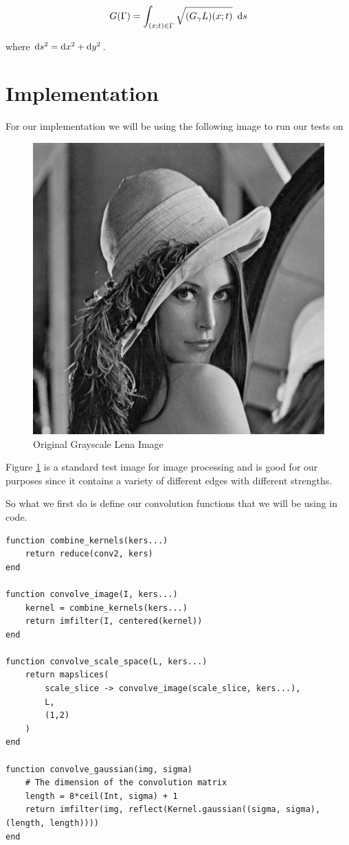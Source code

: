 \documentclass{article}
\begin{document}
\begin{equation}
  G(\Gamma) = \int_{(x;t) \in \Gamma} \sqrt{(G_{\gamma}L)(x;t)} \,\, \operatorname{d \!} s
\end{equation}

where $\operatorname{d \!} s^2=\operatorname{d \!} x^2+\operatorname{d \!} y^2$.

\section{Implementation}
For our implementation we will be using the following image to run our tests on

\begin{figure}[H]
  \centering
  \includegraphics[scale=0.5]{Images/lena.jpg}
  \caption{Original Grayscale Lena Image}
  \label{lena_o}
\end{figure}

Figure \ref{lena_o} is a standard test image for image processing and is good for our purposes since it contains a variety of different edges with different strengths.

So what we first do is define our convolution functions that we will be using in code.

\begin{lstlisting}
function combine_kernels(kers...)
    return reduce(conv2, kers)
end

function convolve_image(I, kers...)
    kernel = combine_kernels(kers...)
    return imfilter(I, centered(kernel))
end

function convolve_scale_space(L, kers...)
    return mapslices(
        scale_slice -> convolve_image(scale_slice, kers...),
        L,
        (1,2)
    )
end

function convolve_gaussian(img, sigma)
    # The dimension of the convolution matrix
    length = 8*ceil(Int, sigma) + 1
    return imfilter(img, reflect(Kernel.gaussian((sigma, sigma), (length, length))))
end
\end{lstlisting}
\end{document}
